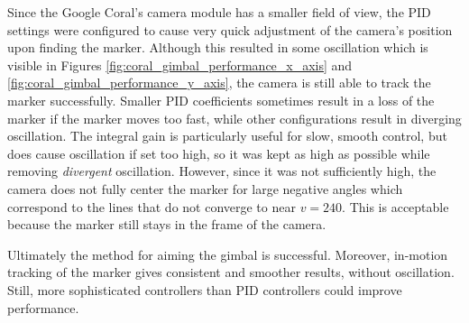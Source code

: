 Since the Google Coral's camera module has a smaller field of view, the PID settings were configured to cause very quick adjustment of the camera's position upon finding the marker. Although this resulted in some oscillation which is visible in Figures \ref{fig:coral_gimbal_performance_x_axis} and \ref{fig:coral_gimbal_performance_y_axis}, the camera is still able to track the marker successfully. Smaller PID coefficients sometimes result in a loss of the marker if the marker moves too fast, while other configurations result in diverging oscillation. The integral gain is particularly useful for slow, smooth control, but does cause oscillation if set too high, so it was kept as high as possible while removing \textit{divergent} oscillation. However, since it was not sufficiently high, the camera does not fully center the marker for large negative angles which correspond to the lines that do not converge to near $v=240$. This is acceptable because the marker still stays in the frame of the camera.

Ultimately the method for aiming the gimbal is successful. Moreover, in-motion tracking of the marker gives consistent and smoother results, without oscillation. Still, more sophisticated controllers than PID controllers could improve performance.

